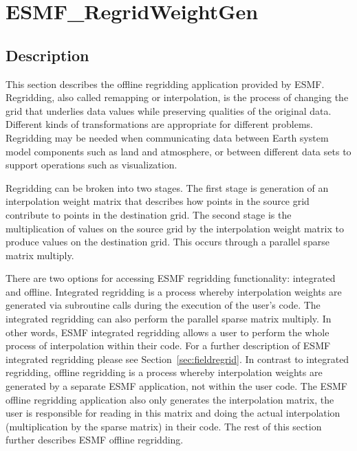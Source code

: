 
\section{ESMF\_RegridWeightGen}
\label{sec:ESMF_RegridWeightGen}

\subsection{Description}

This section describes the offline regridding application provided by ESMF. Regridding, also called remapping or interpolation, is the process of changing the grid that underlies data values while preserving qualities of the original data. Different kinds of transformations are appropriate for different problems. Regridding may be needed when communicating data between Earth system model components such as land and atmosphere, or between different data sets to support operations such as visualization.

Regridding can be broken into two stages. The first stage is generation of an interpolation weight matrix that describes how points in 
the source grid contribute to points in the destination grid. The second stage is the multiplication of values on the source grid by the
interpolation weight matrix to produce values on the destination grid. This occurs through a parallel sparse matrix multiply.

There are two options for accessing ESMF regridding functionality: integrated and offline. Integrated regridding is a process whereby interpolation 
weights are generated via subroutine calls during the execution of the user's code. The integrated regridding can also perform the parallel sparse 
matrix multiply. In other words, ESMF integrated regridding allows a user to perform the whole process of interpolation within their code.
For a further description of ESMF integrated regridding please see Section~\ref{sec:fieldregrid}. In contrast to integrated regridding, 
offline regridding is a process whereby interpolation weights are generated by a separate ESMF application, not within the user code. The ESMF offline 
regridding application also only generates the interpolation matrix, the user is responsible for reading in this matrix and doing the actual interpolation
(multiplication by the sparse matrix) in their code. The rest of this section further describes ESMF offline regridding. 

